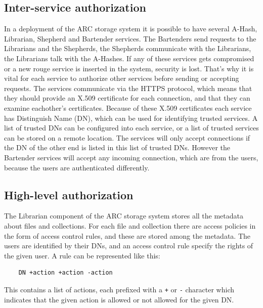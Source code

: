 \documentclass{book}
\begin{document}
\subsection{Inter-service authorization} %
\label{sub:inter_service_authorization}

In a deployment of the ARC storage system it is possible to have several A-Hash, Librarian, Shepherd and Bartender services. The Bartenders send requests to the Librarians and the Shepherds, the Shepherds communicate with the Librarians, the Librarians talk with the A-Hashes. If any of these services gets compromised or a new rouge service is inserted in the system, security is lost. That's why it is vital for each service to authorize other services before sending or accepting requests. The services communicate via the HTTPS protocol, which means that they should provide an X.509 certificate for each connection, and that they can examine eachother's certificates. Because of these X.509 certificates each service has Distinguish Name (DN), which can be used for identifying trusted services. A list of trusted DNs can be configured into each service, or a list of trusted services can be stored on a remote location. The services will only accept connections if the DN of the other end is listed in this list of trusted DNs. However the Bartender services will accept any incoming connection, which are from the users, because the users are authenticated differently.


\subsection{High-level authorization} %
\label{sub:high_level_authorization}

The Librarian component of the ARC storage system stores all the metadata about files and collections. For each file and collection there are access policies in the form of access control rules, and these are stored among the metadata. The users are identified by their DNs, and an access control rule specify the rights of the given user. A rule can be represented like this:

\begin{verbatim}
    DN +action +action -action
\end{verbatim}

This contains a list of actions, each prefixed with a \verb!+! or \verb!-! character which indicates that the given action is allowed or not allowed for the given DN.
\end{document}
